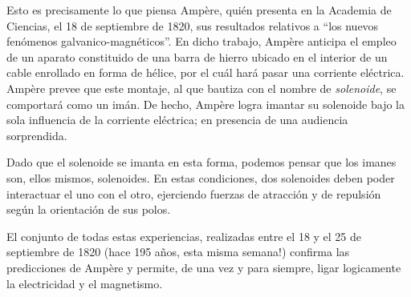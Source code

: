 \documentclass{article}
\begin{document}
Esto es precisamente lo que piensa Amp\`ere, qui\'en presenta en la Academia de
Ciencias, el 18 de septiembre de 1820, sus resultados relativos a ``los nuevos
fen\'omenos galvanico-magn\'eticos''. En dicho trabajo, Amp\`ere anticipa el
empleo de un aparato constituido de una barra de hierro ubicado en el interior
de un cable enrollado en forma de h\'elice, por el cu\'al har\'a pasar una
corriente el\'ectrica. Amp\`ere prevee que este montaje, al que bautiza con el
nombre de {\it solenoide}, se comportar\'a como un im\'an. De hecho, Amp\`ere
logra imantar su solenoide bajo la sola influencia de la corriente el\'ectrica;
en presencia de una audiencia sorprendida. 

Dado que el solenoide se imanta en esta forma, podemos pensar que los imanes
son, ellos mismos, solenoides. En estas condiciones, dos solenoides deben poder
interactuar el uno con el otro, ejerciendo fuerzas de atracci\'on y de
repulsi\'on seg\'un la orientaci\'on de sus polos. 

El conjunto de todas estas experiencias, realizadas entre el 18 y el 25 de
septiembre de 1820 (hace 195 a\~nos, esta misma semana!) confirma las
predicciones de Amp\`ere y permite, de una vez y para siempre, ligar
logicamente la electricidad y el magnetismo. 
\end{document}
